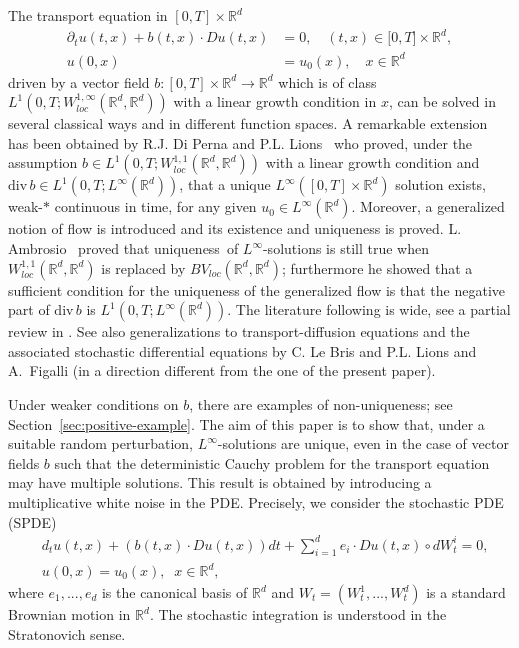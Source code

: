\documentclass[a4paper,11pt]{article}
\begin{document}
The transport equation in $[0,T]\times \mathbb{R}^{d}$%
\begin{align*}
\partial _{t}u(t,x)+b(t,x)\cdot Du(t,x)& =0,\quad (t,x)\in \lbrack
0,T]\times \mathbb{R}^{d}, \\
u(0,x)& =u_{0}(x),\quad x\in \mathbb{R}^{d}
\end{align*}
driven by a vector field $b:[0,T]\times \mathbb{R}^{d}\rightarrow \mathbb{R}%
^{d}$ which is of class $L^{1}(0,T;W_{loc}^{1,\infty }(\mathbb{R}^{d},%
\mathbb{R}^{d}))$ with a linear growth condition in $x$, can be solved in
several classical ways and in different function spaces. A remarkable
extension has been obtained by R.J. Di Perna and P.L. Lions~\cite
{DiPernaLions} who proved, under the assumption $b\in
L^{1}(0,T;W_{loc}^{1,1}(\mathbb{R}^{d},\mathbb{R}^{d}))$ with a linear
growth condition and ${\mathrm{div}\,}b\in L^{1}(0,T;L^{\infty }(\mathbb{R}%
^{d}))$, that a unique $L^{\infty }([0,T]\times \mathbb{R}^{d})$
solution exists, weak-$\ast $ continuous in time, for any given $u_{0}\in
L^{\infty }(\mathbb{R}^{d})$. Moreover, a generalized notion of flow is
introduced and its existence and uniqueness is proved. L. Ambrosio~\cite
{Ambrosio} proved that uniqueness\ of $L^{\infty }$-solutions is still true
when $W_{loc}^{1,1}(\mathbb{R}^{d},\mathbb{R}^{d})$ is replaced by $BV_{loc}(%
\mathbb{R}^{d},\mathbb{R}^{d})$; furthermore he showed that a sufficient
condition for the uniqueness of the generalized flow is that the negative
part of ${\mathrm{div}\,}b$ is $L^{1}(0,T;L^{\infty }(\mathbb{R}^{d}))$. The
literature following \cite{DiPernaLions} is wide, see a partial review in
\cite{AmbrCrippa}. See also generalizations to transport-diffusion equations
and the associated stochastic differential equations by C. Le Bris and P.L.
Lions \cite{LeBrisLions} and A.~Figalli \cite{Figalli} (in a direction
different from the one of the present paper).

Under weaker conditions on $b$, there are examples of non-uniqueness; see
Section~\ref{sec:positive-example}. The aim of this paper is to show that,
under a suitable random perturbation, $L^{\infty }$-solutions are unique,
even in the case of vector fields $b$ such that the deterministic Cauchy
problem for the transport equation may have multiple solutions. This result
is obtained by introducing a multiplicative white noise in the PDE.
Precisely, we consider the stochastic PDE (SPDE)
\begin{equation}
\begin{aligned} & d_{t}u( t,x) +( b( t,x) \cdot D u( t,x) )
dt+\sum_{i=1}^{d}e_{i}\cdot D u( t,x) \circ dW_{t}^{i}=0,\\ & u( 0,x)
=u_{0}( x),\;\; x \in \mathbb{R}^d, \end{aligned}  \label{SPDE}
\end{equation}
where $e_{1},...,e_{d}$ is the canonical basis of ${\mathbb{R}}^{d}$ and $%
W_{t}=(W_{t}^{1},...,W_{t}^{d})$ is a standard Brownian motion in ${\mathbb{R%
}}^{d}$. The stochastic integration is understood in the Stratonovich sense.
\end{document}
